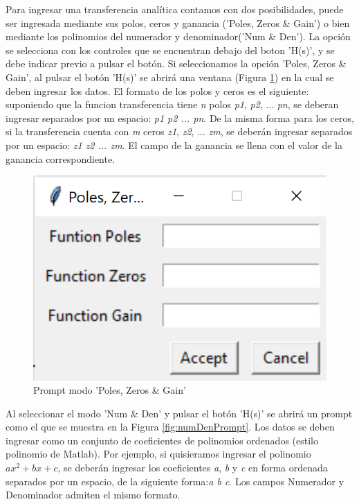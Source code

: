 \documentclass[10pt,a4paper]{article}
\begin{document}
Para ingresar una transferencia analítica contamos con dos posibilidades, puede ser ingresada mediante sus polos, ceros y ganancia ('Poles, Zeros \& Gain') o bien mediante los polinomios del numerador y denominador('Num \& Den'). La opción se selecciona con los controles que se encuentran debajo del boton 'H(s)', y se debe indicar previo a pulsar el botón. 
Si seleccionamos la opción 'Poles, Zeros \& Gain', al pulsar el botón 'H(s)' se abrirá una ventana (Figura \ref{fig:pzgPromt}) en la cual se deben ingresar los datos. El formato de los polos y ceros es el siguiente: suponiendo que la funcion transferencia tiene \emph{n} polos \emph{p1}, \emph{p2}, ... \emph{pn}, se deberan ingresar separados por un espacio: \emph{p1 p2 ... pn}. De la misma forma para los ceros, si la transferencia cuenta con \emph{m} ceros \emph{z1}, \emph{z2}, ... \emph{zm}, se deberán ingresar separados por un espacio: \emph{z1 z2 ... zm}. El campo de la ganancia se llena con el valor de la ganancia correspondiente.

\begin{figure}[ht]
\centering
\includegraphics[scale=0.3]{resources/pzgPrompt.png}
\caption{Prompt modo 'Poles, Zeros \& Gain'}
\label{fig:pzgPromt}
\end{figure}

Al seleccionar el modo 'Num \& Den' y pulsar el botón 'H(s)' se abrirá un prompt como el que se muestra en la Figura \ref{fig:numDenPrompt}. Los datos se deben ingresar como un conjunto de coeficientes de polinomios ordenados (estilo polinomio de Matlab). Por ejemplo, si quisieramos ingresar el polinomio $ax^2 + bx + c$, se deberán ingresar los coeficientes \emph{a}, \emph{b} y \emph{c} en forma ordenada separados por un espacio, de la siguiente forma:\emph{a b c}. Los campos Numerador y Denominador admiten el mismo formato.
\end{document}
